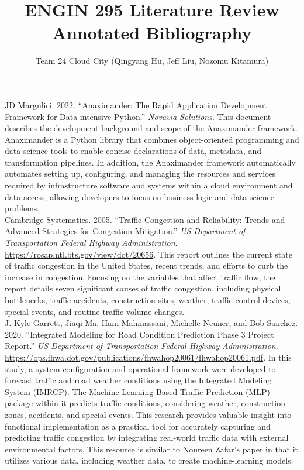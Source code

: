 \documentclass[12pt]{article}
\title{ENGIN 295 Literature Review Annotated Bibliography}
\author{Team 24 Cloud City (Qingyang Hu, Jeff Liu, Nozomu Kitamura)}
\date{}
\begin{document}
\setlength{\parindent}{-40pt}

\maketitle
JD Margulici. 2022. ``Anaximander: The Rapid Application Development Framework for Data-intensive Python.'' {\it Novavia Solutions}. 
This document describes the development background and scope of the Anaximander framework. Anaximander is a Python library that combines object-oriented programming and data science tools to enable concise declarations of data, metadata, and transformation pipelines. In addition, the Anaximander framework automatically automates setting up, configuring, and managing the resources and services required by infrastructure software and systems within a cloud environment and data access, allowing developers to focus on business logic and data science problems. \\

Cambridge Systematics. 2005. ``Traffic Congestion and Reliability: Trends and Advanced Strategies for Congestion Mitigation.'' {\it US Department of Transportation Federal Highway Administration}. \url{https://rosap.ntl.bts.gov/view/dot/20656}.
This report outlines the current state of traffic congestion in the United States, recent trends, and efforts to curb the increase in congestion. Focusing on the variables that affect traffic flow, the report details seven significant causes of traffic congestion, including physical bottlenecks, traffic accidents, construction sites, weather, traffic control devices, special events, and routine traffic volume changes. \\

J. Kyle Garrett, Jiaqi Ma, Hani Mahmassani, Michelle Neuner, and Bob Sanchez. 2020. ``Integrated Modeling for Road Condition Prediction Phase 3 Project Report.'' {\it US Department of Transportation Federal Highway Administration}. \url{https://ops.fhwa.dot.gov/publications/fhwahop20061/fhwahop20061.pdf}.
In this study, a system configuration and operational framework were developed to forecast traffic and road weather conditions using the Integrated Modeling System (IMRCP). The Machine Learning Based Traffic Prediction (MLP) package within it predicts traffic conditions, considering weather, construction zones, accidents, and special events. This research provides valuable insight into functional implementation as a practical tool for accurately capturing and predicting traffic congestion by integrating real-world traffic data with external environmental factors. This resource is similar to Noureen Zafar’s paper in that it utilizes various data, including weather data, to create machine-learning models. \\
\end{document}
